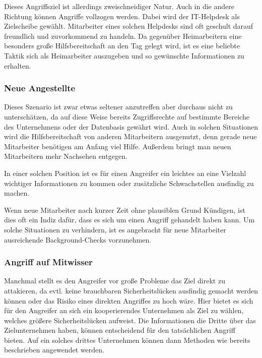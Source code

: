 Dieses Angriffsziel ist allerdings zweischneidiger Natur. Auch in die andere Richtung können Angriffe
vollzogen werden.
Dabei wird der IT-Helpdesk als Zielscheibe gewählt.
Mitarbeiter eines solchen Helpdesks sind oft geschult darauf freundlich und zuvorkommend zu handeln.
Da gegenüber Heimarbeitern eine besonders große Hilfsbereitschaft an den Tag gelegt wird, ist es eine
beliebte Taktik sich als Heimarbeiter auszugeben und so gewünschte Informationen zu erhalten. \cite{hacking-the-human}

\subsubsection{Neue Angestellte}\label{neueangestellte}
Dieses Szenario ist zwar etwas seltener anzutreffen aber durchaus nicht zu unterschätzen, da auf diese
Weise bereits Zugriffsrechte auf bestimmte Bereiche des Unternehmens oder der Datenbasis gewährt wird.
Auch in solchen Situationen wird die Hilfsbereitschaft von anderen Mitarbeitern ausgenutzt, denn
gerade neue Mitarbeiter benötigen am Anfang viel Hilfe.
Außerdem bringt man neuen Mitarbeitern mehr Nachsehen entgegen.

In einer solchen Position ist es für einen Angreifer ein leichtes an eine Vielzahl wichtiger
Informationen zu kommen oder zusätzliche Schwachstellen ausfindig zu machen.

Wenn neue Mitarbeiter nach kurzer Zeit ohne plausiblen Grund Kündigen, ist dies oft ein Indiz dafür,
dass es sich um einen Angriff gehandelt haben kann.
Um solche Situationen zu verhindern, ist es angebracht für neue Mitarbeiter ausreichende Background-Checks vorzunehmen. \cite{hacking-the-human}

\subsubsection{Angriff auf Mitwisser}\label{angriffaufmitwisser}
Manchmal stellt es den Angreifer vor große Probleme das Ziel direkt zu attakieren, da evtl. keine
brauchbaren Sicherheitslücken ausfindig gemacht werden können oder das Risiko eines direkten Angriffes
zu hoch wäre.
Hier bietet es sich für den Angreifer an sich ein kooperierendes Unternehmen als Ziel zu wählen,
welches größere Sicherheitslücken aufweist.
Die Informationen die Dritte über das Zielunternehmen haben, können entscheidend für den tatsächlichen
Angriff bieten.
Auf ein solches drittes Unternehmen können dann Methoden wie bereits beschrieben angewendet werden. \cite{hacking-the-human}

